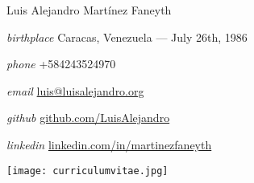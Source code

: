 \documentclass[10pt,letterpaper]{article}
\begin{document}
\begin{cv}{Luis Alejandro Mart\'inez Faneyth}
\vspace{1em}

\begin{minipage}{.7\linewidth}
\begin{cvlist}{}
\item[\textit{\large{birthplace}}]{Caracas, Venezuela --- July 26th, 1986}
\item[\textit{\large{phone}}]{+584243524970}
\item[\textit{\large{email}}]{\href{mailto:luis@luisalejandro.org}{luis@luisalejandro.org}}
\item[\textit{\large{github}}]{\href{http://github.com/LuisAlejandro}{github.com/LuisAlejandro}}
\item[\textit{\large{linkedin}}]{\href{https://www.linkedin.com/in/martinezfaneyth}{linkedin.com/in/martinezfaneyth}}
\end{cvlist}
\end{minipage}
\begin{minipage}{.3\linewidth}
\texttt{[image: curriculumvitae.jpg]}
\end{minipage}
\vspace{1em}


\end{cv}
\end{document}
